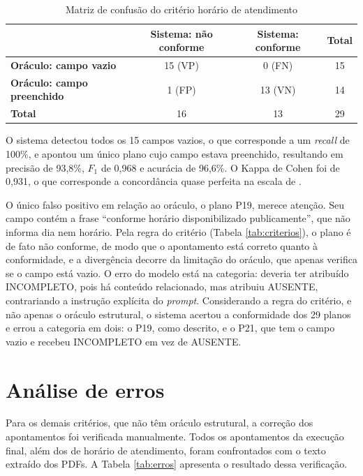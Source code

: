 \begin{table}[H]
\centering
\caption{Matriz de confusão do critério horário de atendimento}
\label{tab:confusao}
\footnotesize
\begin{tabular}{@{}lccc@{}}
\toprule
\rowcolor[HTML]{EFEFEF}
 & \textbf{Sistema: não conforme} & \textbf{Sistema: conforme} & \textbf{Total} \\ \midrule
\textbf{Oráculo: campo vazio} & 15 (VP) & 0 (FN) & 15 \\
\textbf{Oráculo: campo preenchido} & 1 (FP) & 13 (VN) & 14 \\
\textbf{Total} & 16 & 13 & 29 \\ \bottomrule
\end{tabular}
\end{table}

O sistema detectou todos os 15 campos vazios, o que corresponde a um \textit{recall} de 100\%, e apontou um único plano cujo campo estava preenchido, resultando em precisão de 93,8\%, $F_1$ de 0,968 e acurácia de 96,6\%. O Kappa de Cohen foi de 0,931, o que corresponde a concordância quase perfeita na escala de .

O único falso positivo em relação ao oráculo, o plano P19, merece atenção. Seu campo contém a frase ``conforme horário disponibilizado publicamente'', que não informa dia nem horário. Pela regra do critério (Tabela \ref{tab:criterios}), o plano é de fato não conforme, de modo que o apontamento está correto quanto à conformidade, e a divergência decorre da limitação do oráculo, que apenas verifica se o campo está vazio. O erro do modelo está na categoria: deveria ter atribuído INCOMPLETO, pois há conteúdo relacionado, mas atribuiu AUSENTE, contrariando a instrução explícita do \textit{prompt}. Considerando a regra do critério, e não apenas o oráculo estrutural, o sistema acertou a conformidade dos 29 planos e errou a categoria em dois: o P19, como descrito, e o P21, que tem o campo vazio e recebeu INCOMPLETO em vez de AUSENTE.

\section{Análise de erros}
\label{sec:res-erros}

Para os demais critérios, que não têm oráculo estrutural, a correção dos apontamentos foi verificada manualmente. Todos os apontamentos da execução final, além dos de horário de atendimento, foram confrontados com o texto extraído dos PDFs. A Tabela \ref{tab:erros} apresenta o resultado dessa verificação.


